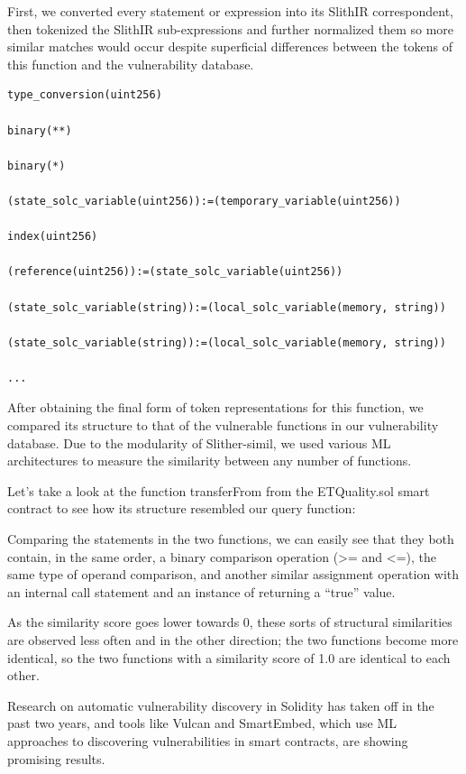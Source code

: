 First, we converted every statement or expression into its SlithIR correspondent, then tokenized the SlithIR sub-expressions and further normalized them so more similar matches would occur despite superficial differences between the tokens of this function and the vulnerability database.

\begin{lstlisting}[float,caption= Normalized SlithIR tokens of the previous expressions., escapechar=\%, language=Solidity, label=lst:solidity-bug]
type_conversion(uint256)
 
binary(**)
 
binary(*)
 
(state_solc_variable(uint256)):=(temporary_variable(uint256))
 
index(uint256)
 
(reference(uint256)):=(state_solc_variable(uint256))
 
(state_solc_variable(string)):=(local_solc_variable(memory, string))
 
(state_solc_variable(string)):=(local_solc_variable(memory, string))
 
...
  \end{lstlisting}

After obtaining the final form of token representations for this function, we compared its structure to that of the vulnerable functions in our vulnerability database.
Due to the modularity of Slither-simil, we used various ML architectures to measure the similarity between any number of functions.

Let's take a look at the function transferFrom from the ETQuality.sol smart contract to see how its structure resembled our query function:

Comparing the statements in the two functions, we can easily see that they both contain, in the same order, a binary comparison operation (>= and <=), the same type of operand comparison, and another similar assignment operation with an internal call statement and an instance of returning a “true” value.

As the similarity score goes lower towards 0, these sorts of structural similarities are observed less often and in the other direction; the two functions become more identical, so the two functions with a similarity score of 1.0 are identical to each other.

Research on automatic vulnerability discovery in Solidity has taken off in the past two years, and tools like Vulcan and SmartEmbed, which use ML approaches to discovering vulnerabilities in smart contracts, are showing promising results.


